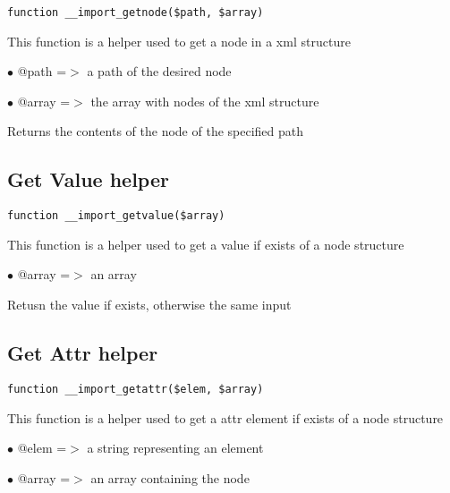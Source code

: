 \documentclass[a4paper]{book}
\begin{document}
\begin{lstlisting}
function __import_getnode($path, $array)
\end{lstlisting}

This function is a helper used to get a node in a xml structure

\begin{compactitem}
\item[\color{myblue}$\bullet$] @path  =$>$ a path of the desired node
\item[\color{myblue}$\bullet$] @array =$>$ the array with nodes of the xml structure
\end{compactitem}

Returns the contents of the node of the specified path

\hypertarget{toc157}{}
\subsection{Get Value helper}

\begin{lstlisting}
function __import_getvalue($array)
\end{lstlisting}

This function is a helper used to get a value if exists of a node structure

\begin{compactitem}
\item[\color{myblue}$\bullet$] @array =$>$ an array
\end{compactitem}

Retusn the value if exists, otherwise the same input

\hypertarget{toc158}{}
\subsection{Get Attr helper}

\begin{lstlisting}
function __import_getattr($elem, $array)
\end{lstlisting}

This function is a helper used to get a attr element if exists of a node structure

\begin{compactitem}
\item[\color{myblue}$\bullet$] @elem  =$>$ a string representing an element
\item[\color{myblue}$\bullet$] @array =$>$ an array containing the node
\end{compactitem}
\end{document}
